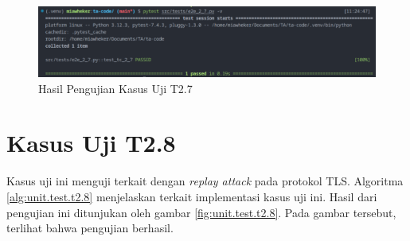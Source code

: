 \begin{figure}[ht]
  \centering
  \includegraphics[width=\textwidth]{chapters/res/appendix-4/2.7.png}
  \caption{Hasil Pengujian Kasus Uji T2.7}
  \label{fig:unit.test.t2.7}
\end{figure}

\section{Kasus Uji T2.8}

Kasus uji ini menguji terkait dengan \emph{replay attack} pada protokol TLS. Algoritma \ref{alg:unit.test.t2.8} menjelaskan terkait implementasi kasus uji ini. Hasil dari pengujian ini ditunjukan oleh gambar \ref{fig:unit.test.t2.8}. Pada gambar tersebut, terlihat bahwa pengujian berhasil.


